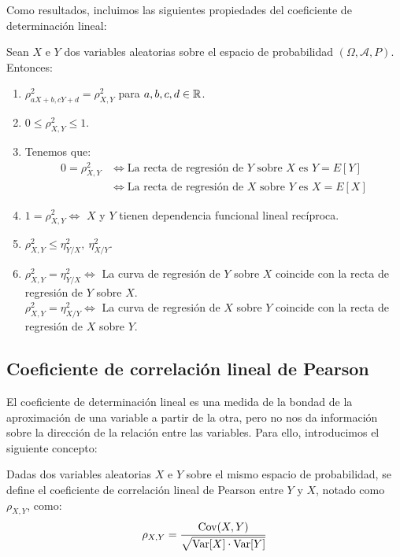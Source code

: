Como resultados, incluimos las siguientes propiedades del coeficiente de determinación lineal:
\begin{prop}
    Sean $X$ e $Y$ dos variables aleatorias sobre el espacio de probabilidad $(\Omega, \mathcal{A}, P)$. Entonces:
    \begin{enumerate}

        \item $\rho_{aX+b,cY+d}^2 = \rho_{X,Y}^2$ para $a,b,c,d\in\mathbb{R}$.
        \item $0\leq \rho^2_{X,Y} \leq 1$.
        \item Tenemos que:
        \begin{align*}
            0 = \rho^2_{X,Y} &\iff \text{La recta de regresión de } Y \text{ sobre } X \text{ es } Y = E[Y]\\
            & \iff \text{La recta de regresión de } X \text{ sobre } Y \text{ es } X = E[X]
        \end{align*}

        \item $1=\rho^2_{X,Y} \iff$ $X$ y $Y$ tienen dependencia funcional lineal recíproca.
        
        \item $\rho^2_{X,Y} \leq \eta_{Y/X}^2,~\eta_{X/Y}^2$.
        
        \item $\rho^2_{X,Y} = \eta_{Y/X}^2 \iff$ La curva de regresión de $Y$ sobre $X$ coincide con la recta de regresión de $Y$ sobre $X$.\\
        $\rho^2_{X,Y} = \eta_{X/Y}^2 \iff$ La curva de regresión de $X$ sobre $Y$ coincide con la recta de regresión de $X$ sobre $Y$.
    \end{enumerate}
\end{prop}

\subsection{Coeficiente de correlación lineal de Pearson}

El coeficiente de determinación lineal es una medida de la bondad de la aproximación de una variable a partir de la otra, pero no nos da información sobre la dirección de la relación entre las variables. Para ello, introducimos el siguiente concepto:
\begin{definicion}
    Dadas dos variables aleatorias $X$ e $Y$ sobre el mismo espacio de probabilidad, se define el coeficiente de correlación lineal de Pearson entre $Y$ y $X$, notado como $\rho_{X,Y}$, como:
    \begin{equation*}
        \rho_{X,Y} = \dfrac{\operatorname{Cov}(X,Y)}{\sqrt{\operatorname{Var}[X]\cdot \operatorname{Var}[Y]}}
    \end{equation*}
\end{definicion}

